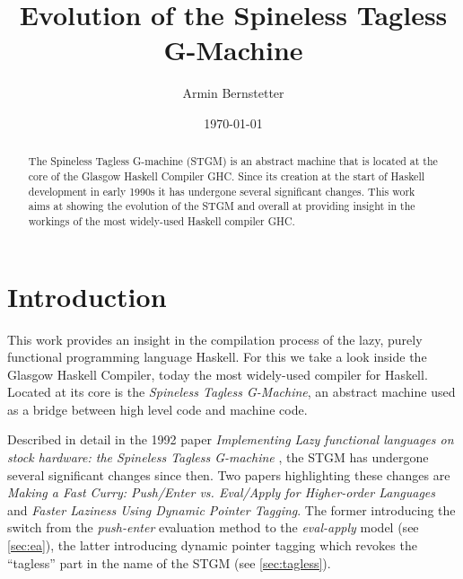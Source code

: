 \documentclass[runningheads]{llncs}
\begin{document}
%
\title{Evolution of the Spineless Tagless G-Machine}
%
%
\author{Armin Bernstetter}
\date{\today}
%
%
%
\maketitle              %
%
\begin{abstract}
The Spineless Tagless G-machine (STGM) is an abstract machine that is located at the core of the Glasgow Haskell Compiler GHC. Since its creation at the start of Haskell development in early 1990s it has undergone several significant changes. This work aims at showing the evolution of the STGM and overall at providing insight in the workings of the most widely-used Haskell compiler GHC.

\end{abstract}
%
%
%

\section{Introduction}

This work provides an insight in the compilation process of the lazy, purely functional programming language Haskell. For this we take a look inside the Glasgow Haskell Compiler, today the most widely-used compiler for Haskell. Located at its core is the \textit{Spineless Tagless G-Machine}, an abstract machine used as a bridge between high level code and machine code.

Described in detail in the 1992 paper \textit{Implementing Lazy functional languages on stock hardware: the Spineless Tagless G-machine} \cite{jones1992implementing}, the STGM has undergone several significant changes since then. Two papers highlighting these changes are \textit{Making a Fast Curry: Push/Enter vs.
Eval/Apply for Higher-order Languages}\cite{marlow2004making} and \textit{Faster Laziness Using Dynamic Pointer Tagging}\cite{marlow2007faster}. The former introducing the switch from the \textit{push-enter} evaluation method to the \textit{eval-apply} model (see \cref{sec:ea}), the latter introducing dynamic pointer tagging which revokes the \enquote{tagless} part in the name of the STGM (see \cref{sec:tagless}).
\end{document}
